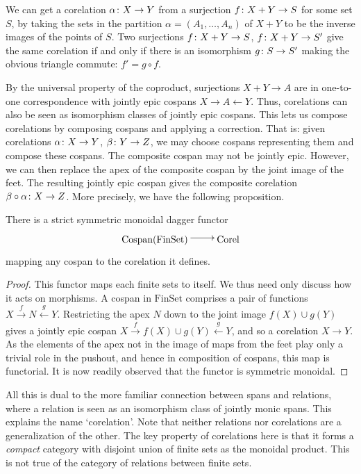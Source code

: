 We can get a corelation $\alpha {\colon} X \to Y$ from a surjection $f {\colon} X + Y
\to S$ for some set $S$, by taking the sets in the partition $\alpha = (A_1,
\dots, A_n)$ of $X+Y$ to be the inverse images of the points of $S$.  Two
surjections $f {\colon} X + Y \to S$, $f {\colon} X + Y \to S'$ give the same
corelation if and only if there is an isomorphism $g {\colon} S \to S'$ making the
obvious triangle commute: $f' = g \circ f$.

By the universal property of the coproduct, surjections $X+Y \to A$ are in
one-to-one correspondence with jointly epic cospans $X \rightarrow A \leftarrow
Y$.   Thus, corelations can also be seen as isomorphism classes of jointly epic
cospans.  This lets us compose corelations by composing cospans and applying a
correction.  That is: given corelations $\alpha{\colon} X \to Y$, $\beta{\colon} Y \to
Z$, we may choose cospans representing them and compose these cospans.   The
composite cospan may not be jointly epic.  However, we can then replace the apex
of the composite cospan by the joint image of the feet.  The resulting jointly
epic cospan gives the composite corelation $\beta \circ \alpha{\colon} X \to Z$.
More precisely, we have the following proposition.

\begin{proposition}
  There is a strict symmetric monoidal dagger functor
  \[
    \xymatrix{
      \mathrm{Cospan(FinSet)}  \ar@<.5ex>[r] & \mathrm{Corel} 
    }
  \]
  mapping any cospan to the corelation it defines.
\end{proposition}
\begin{proof}
  This functor maps each finite sets to itself.  We thus need only discuss how
  it acts on morphisms.  A cospan in $\mathrm{FinSet}$ comprises a pair of
  functions $X \stackrel{f}\rightarrow N \stackrel{g}\leftarrow Y$. Restricting
  the apex $N$ down to the joint image $f(X) \cup g(Y)$ gives a jointly epic
  cospan $X \stackrel{f}\rightarrow f(X) \cup g(Y) \stackrel{g}\leftarrow Y$,
  and so a corelation $X \rightarrow Y$. As the elements of the apex not in the
  image of maps from the feet play only a trivial role in the pushout, and hence
  in composition of cospans, this map is functorial. It is now readily observed
  that the functor is symmetric monoidal.
\end{proof}

All this is dual to the more familiar connection between spans and relations,
where a relation is seen as an isomorphism class of jointly monic spans.  This
explains the name `corelation'. Note that neither relations nor corelations are
a generalization of the other.  The key property of corelations here is that it
forms a \emph{compact} category with disjoint union of finite sets as the
monoidal product.  This is not true of the category of relations between finite
sets.


